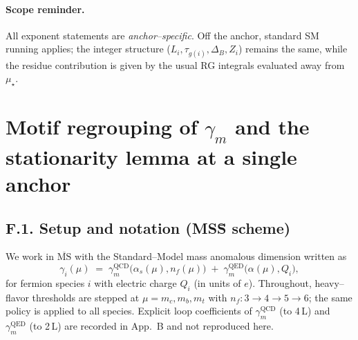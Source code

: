\documentclass[epjc3]{svjour3}
\begin{document}
\paragraph{Scope reminder.}
All exponent statements are \emph{anchor–specific}. Off the anchor, standard SM running applies; the integer structure (\(L_i,\tau_{g(i)},\Delta_B,Z_i\)) remains the same, while the residue contribution is given by the usual RG integrals evaluated away from \(\mu_\star\).

\section{Motif regrouping of $\gamma_m$ and the stationarity lemma at a single anchor}


\subsection*{F.1. Setup and notation (MS\={S} scheme)}
We work in $\overline{\mathrm{MS}}$ with the Standard--Model mass anomalous dimension written as
\begin{equation}
  \gamma_i(\mu)\;=\;\gamma^{\mathrm{QCD}}_m\!\bigl(\alpha_s(\mu),n_f(\mu)\bigr)\;+\;\gamma^{\mathrm{QED}}_m\!\bigl(\alpha(\mu),Q_i\bigr),
  \label{eq:F.gamma.split}
\end{equation}
for fermion species $i$ with electric charge $Q_i$ (in units of $e$).  Throughout, heavy--flavor thresholds are stepped at $\mu=m_c,m_b,m_t$ with $n_f:3\!\to\!4\!\to\!5\!\to\!6$; the same policy is applied to all species.  Explicit loop coefficients of $\gamma^{\mathrm{QCD}}_m$ (to 4\,L) and $\gamma^{\mathrm{QED}}_m$ (to 2\,L) are recorded in App.~B and not reproduced here.
\end{document}
